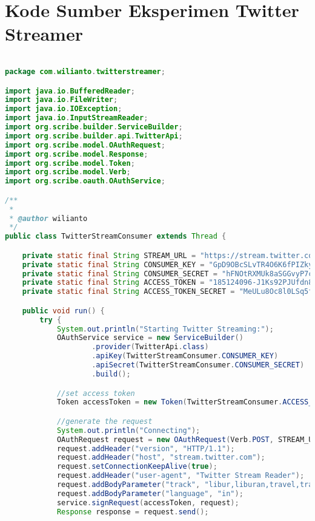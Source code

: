 \chapter{Kode Sumber Eksperimen Twitter Streamer}
\label{app:B}

\singlespacing 
%
%
\begin{lstlisting}[language=Java,basicstyle=\tiny,caption=TwitterStreamerConsumer.java]

package com.wilianto.twitterstreamer;

import java.io.BufferedReader;
import java.io.FileWriter;
import java.io.IOException;
import java.io.InputStreamReader;
import org.scribe.builder.ServiceBuilder;
import org.scribe.builder.api.TwitterApi;
import org.scribe.model.OAuthRequest;
import org.scribe.model.Response;
import org.scribe.model.Token;
import org.scribe.model.Verb;
import org.scribe.oauth.OAuthService;

/**
 *
 * @author wilianto
 */
public class TwitterStreamConsumer extends Thread {

    private static final String STREAM_URL = "https://stream.twitter.com/1.1/statuses/filter.json";
    private static final String CONSUMER_KEY = "GpD9OBcSLvTR4O6K6fPIZkyuh";
    private static final String CONSUMER_SECRET = "hFNOtRXMUk8aSGGvyP7cIYOz8B2yarnqrpipBujvtAkXIgdgnt";
    private static final String ACCESS_TOKEN = "185124096-J1Ks92PJUfdn8ULlROFqRuUtZnwao6iVhpufsUXT";
    private static final String ACCESS_TOKEN_SECRET = "MeULu8Oc8l0LSq5fmB5V0CpsWYYBCWdQenJPczpEqpeAp";

    public void run() {
        try {
            System.out.println("Starting Twitter Streaming:");
            OAuthService service = new ServiceBuilder()
                    .provider(TwitterApi.class)
                    .apiKey(TwitterStreamConsumer.CONSUMER_KEY)
                    .apiSecret(TwitterStreamConsumer.CONSUMER_SECRET)
                    .build();

            //set access token
            Token accessToken = new Token(TwitterStreamConsumer.ACCESS_TOKEN, TwitterStreamConsumer.ACCESS_TOKEN_SECRET);

            //generate the request
            System.out.println("Connecting");
            OAuthRequest request = new OAuthRequest(Verb.POST, STREAM_URL);
            request.addHeader("version", "HTTP/1.1");
            request.addHeader("host", "stream.twitter.com");
            request.setConnectionKeepAlive(true);
            request.addHeader("user-agent", "Twitter Stream Reader");
            request.addBodyParameter("track", "libur,liburan,travel,travelling,wisata,tour,pariwisata,destinasi,hotel,pesawat");
            request.addBodyParameter("language", "in");
            service.signRequest(accessToken, request);
            Response response = request.send();


\end{lstlisting}
